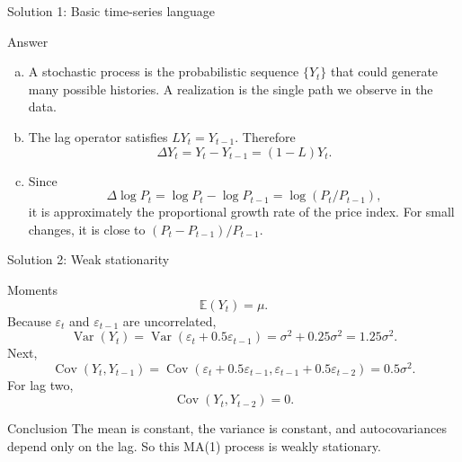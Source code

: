 \documentclass[10pt]{beamer}
\DeclareMathOperator{\Cov}{Cov}
\DeclareMathOperator{\Var}{Var}
\newcommand{\E}{\mathbb{E}}
\newcommand{\eps}{\varepsilon}
\begin{document}
\begin{frame}{Solution 1: Basic time-series language}
\label{s1}
\small
\begin{exampleblock}{Answer}
\begin{enumerate}[(a)]
  \item A stochastic process is the probabilistic sequence $\{Y_t\}$ that could generate many possible histories. A realization is the single path we observe in the data.
  \item The lag operator satisfies $LY_t=Y_{t-1}$. Therefore
  \[
  \Delta Y_t=Y_t-Y_{t-1}=(1-L)Y_t.
  \]
  \item Since
  \[
  \Delta\log P_t=\log P_t-\log P_{t-1}
  =\log(P_t/P_{t-1}),
  \]
  it is approximately the proportional growth rate of the price index. For small changes, it is close to $(P_t-P_{t-1})/P_{t-1}$.
\end{enumerate}
\end{exampleblock}
\vfill
\hfill\hyperlink{q1}{}
\end{frame}

\begin{frame}{Solution 2: Weak stationarity}
\label{s2}
\small
\begin{exampleblock}{Moments}
\[
\E(Y_t)=\mu.
\]
Because $\eps_t$ and $\eps_{t-1}$ are uncorrelated,
\[
\Var(Y_t)=\Var(\eps_t+0.5\eps_{t-1})
=\sigma^2+0.25\sigma^2=1.25\sigma^2.
\]
Next,
\[
\Cov(Y_t,Y_{t-1})
=\Cov(\eps_t+0.5\eps_{t-1},\eps_{t-1}+0.5\eps_{t-2})
=0.5\sigma^2.
\]
For lag two,
\[
\Cov(Y_t,Y_{t-2})=0.
\]
\end{exampleblock}

\begin{block}{Conclusion}
The mean is constant, the variance is constant, and autocovariances depend only on the lag. So this MA(1) process is weakly stationary.
\end{block}
\vfill
\hfill\hyperlink{q2}{}
\end{frame}
\end{document}
